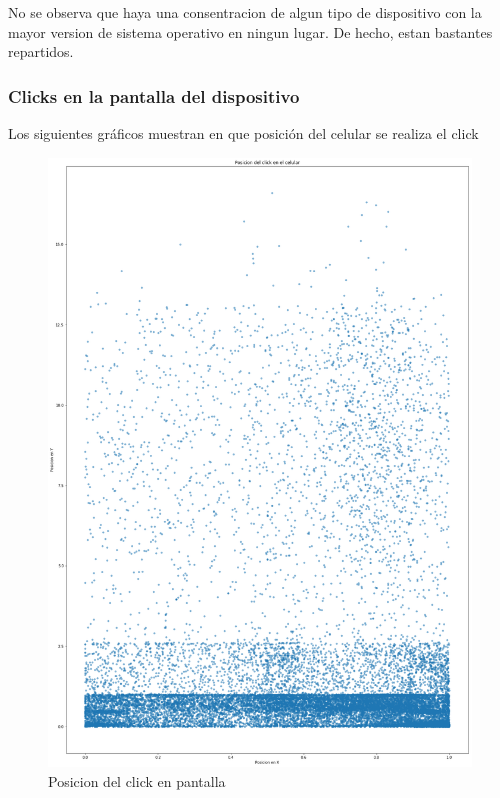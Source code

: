 \documentclass[a4paper, 12pt]{article}
\newcommand\tab[1][1cm]{\hspace*{#1}}
\begin{document}
		\tab No se observa que haya una consentracion de algun tipo de dispositivo con la mayor version de sistema operativo en ningun lugar. De hecho, estan bastantes repartidos.

	\subsubsection{Clicks en la pantalla del dispositivo}

		\tab Los siguientes gráficos muestran en que posición del celular se realiza el click

		\FloatBarrier
		\begin{figure}[h]
			\centering
			\includegraphics[width=\textwidth]{images/clicks/clicks_touch_scatter.png}
			\caption{Posicion del click en pantalla}
		\end{figure}
		\FloatBarrier
\end{document}
